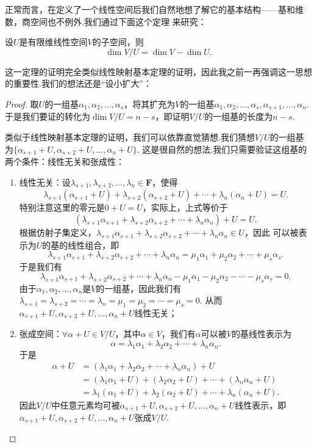 正常而言，在定义了一个线性空间后我们自然地想了解它的基本结构——基和维数，商空间也不例外.我们通过下面这个定理
来研究：
\begin{theorem}\label{thm:8:商空间维数}
    设$U$是有限维线性空间$V$的子空间，则
    \[\dim V/U=\dim V-\dim U.\]
\end{theorem}
这一定理的证明完全类似线性映射基本定理的证明，因此我之前一再强调这一思想的重要性.我们的想法还是``设小扩大''：

\begin{proof}
    取$U$的一组基$\alpha_1,\alpha_2,\ldots,\alpha_s$，将其扩充为$V$的一组基$\alpha_1,\alpha_2,\ldots,\alpha_s,\alpha_{s+1},\ldots,\alpha_n$.
    于是我们要证的转化为$\dim V/U=n-s$，即证明$V/U$的一组基的长度为$n-s$.

    类似于线性映射基本定理的证明，我们可以依靠直觉猜想.我们猜想$V/U$的一组基为$\{\alpha_{s+1}+U,\alpha_{s+2}+U,\ldots,\alpha_n+U\}$.
    这是很自然的想法.我们只需要验证这组基的两个条件：线性无关和张成性：
    \begin{enumerate}
        \item 线性无关：设$\lambda_{s+1},\lambda_{s+2},\ldots,\lambda_n\in\mathbf{F}$，使得
        \[\lambda_{s+1}(\alpha_{s+1}+U)+\lambda_{s+2}(\alpha_{s+2}+U)+\cdots+\lambda_n(\alpha_n+U)=U.\]
        特别注意这里的零元是$0+U=U$，实际上，上式等价于
        \[(\lambda_{s+1}\alpha_{s+1}+\lambda_{s+2}\alpha_{s+2}+\cdots+\lambda_n\alpha_n)+U=U.\]
        根据仿射子集定义，$\lambda_{s+1}\alpha_{s+1}+\lambda_{s+2}\alpha_{s+2}+\cdots+\lambda_n\alpha_n\in U$，因此
        可以被表示为$U$的基的线性组合，即
        \[\lambda_{s+1}\alpha_{s+1}+\lambda_{s+2}\alpha_{s+2}+\cdots+\lambda_n\alpha_n=\mu_1\alpha_1+\mu_2\alpha_2+\cdots+\mu_s\alpha_s.\]
        于是我们有
        \[\lambda_{s+1}\alpha_{s+1}+\lambda_{s+2}\alpha_{s+2}+\cdots+\lambda_n\alpha_n-\mu_1\alpha_1-\mu_2\alpha_2-\cdots-\mu_s\alpha_s=0.\]
        由于$\alpha_1,\alpha_2,\ldots,\alpha_n$是$V$的一组基，因此我们有
        $\lambda_{s+1}=\lambda_{s+2}=\cdots=\lambda_n=\mu_1=\mu_2=\cdots=\mu_s=0$.
        从而$\alpha_{s+1}+U,\alpha_{s+2}+U,\ldots,\alpha_n+U$线性无关；

        \item 张成空间：$\forall\alpha+U\in V/U$，其中$\alpha\in V$，我们有$\alpha$可以被$V$的基线性表示为
        \[\alpha=\lambda_1\alpha_1+\lambda_2\alpha_2+\cdots+\lambda_n\alpha_n.\]
        于是
        \begin{align*}
            \alpha+U&=(\lambda_1\alpha_1+\lambda_2\alpha_2+\cdots+\lambda_n\alpha_n)+U\\
            &=(\lambda_1\alpha_1+U)+(\lambda_2\alpha_2+U)+\cdots+(\lambda_n\alpha_n+U)\\
            &=\lambda_1(\alpha_1+U)+\lambda_2(\alpha_2+U)+\cdots+\lambda_n(\alpha_n+U).
        \end{align*}
        因此$V/U$中任意元素均可被$\alpha_{s+1}+U,\alpha_{s+2}+U,\ldots,\alpha_n+U$线性表示，即$\alpha_{s+1}+U,\alpha_{s+2}+U,\ldots,\alpha_n+U$张成$V/U$.
    \end{enumerate}
\end{proof}

